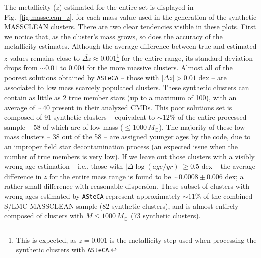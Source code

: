 \documentclass{aa}
\begin{document}
\begin{appendix}
The metallicity ($z$) estimated for the entire set is displayed in
Fig.~\ref{fig:massclean_z}, for each mass value used in the generation of the
synthetic MASSCLEAN clusters. There are two clear tendencies visible in these
plots.
%
First we notice that, as the cluster's mass grows, so does the accuracy of the
metallicity estimates. Although the average difference between true and
estimated $z$ values remains close to
$\overline{\Delta z}{\approx}0.001$\footnote{This is expected, as $z{=}0.001$
is the metallicity step used when processing the synthetic clusters with
\texttt{ASteCA}.} for the entire range, its standard deviation drops from $
{\sim}0.01$ to $0.004$ for the more massive clusters.
%
%
Almost all of the poorest solutions obtained by \texttt{ASteCA} -- those with
$|\Delta z|{>}0.01$ dex -- are associated to low mass scarcely populated
clusters. These synthetic clusters can contain as little as 2 true member stars
(up to a maximum of 100), with an average of ${\sim}40$ present in their
analyzed CMDs. This poor solutions set is composed of 91 synthetic clusters
-- equivalent to ${\sim}12\%$ of the entire processed sample -- 58 of which are
of low mass (${\le}1000\,M_{\odot}$).
%
The majority of these low mass clusters -- 38 out of the 58 -- are assigned
younger ages by the code, due to an improper field star decontamination process 
(an expected issue when the number of true members is very low).
%
If we leave out those clusters with a visibly wrong age estimation -- i.e.,
those with $|\Delta\log(age/yr)|{\ge}0.5$ dex -- the average difference in $z$
for the entire mass range is found to be ${\sim}0.0008{\pm}0.006$ dex; a rather
small difference with reasonable dispersion.
These subset of clusters with wrong ages estimated by \texttt{ASteCA} represent
approximately ${\sim}11\%$ of the combined S/LMC MASSCLEAN sample (82 synthetic
clusters), and is almost entirely composed of clusters with
$M{\le}1000\,M_{\odot}$ (73 synthetic clusters).


\end{appendix}
\end{document}
